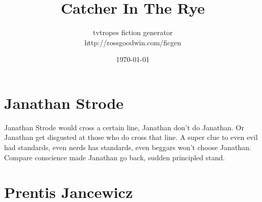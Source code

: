 \documentclass[12pt]{book}
\title{Catcher In The Rye}
\author{tvtropes fiction generator\\http://rossgoodwin.com/ficgen}
\date{\today}
\begin{document}
\maketitle


\chapter{Janathan Strode}
Janathan Strode would cross a certain line, Janathan don't do Janathan. Or Janathan get disgusted at those who do cross that line. A super clue to even evil had standards, even nerds has standards, even beggars won't choose Janathan. Compare conscience made Janathan go back, sudden principled stand.

\chapter{Prentis Jancewicz}
\end{document}
